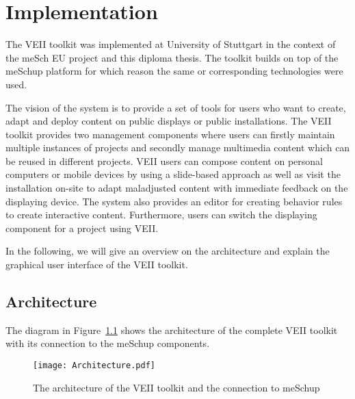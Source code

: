 
\chapter{Implementation}
\label{chap:implementation}
The VEII toolkit was implemented at University of Stuttgart in the context of the meSch EU project and this diploma thesis. The toolkit builds on top of the meSchup platform for which reason the same or corresponding technologies were used. 

The vision of the system is to provide a set of tools for users who want to create, adapt and deploy content on public displays or public installations. The VEII toolkit provides two management components where users can firstly maintain multiple instances of projects and secondly manage multimedia content which can be reused in different projects. VEII users can compose content on personal computers or mobile devices by using a slide-based approach as well as visit the installation on-site to adapt maladjusted content with immediate feedback on the displaying device. The system also provides an editor for creating behavior rules to create interactive content. Furthermore, users can switch the displaying component for a project using VEII.

In the following, we will give an overview on the architecture and explain the graphical user interface of the VEII toolkit. 
 
\section{Architecture}\label{architecture}
The diagram in Figure~\ref{fig:architecture} shows the architecture of the complete VEII toolkit with its connection to the meSchup components. 

\begin{figure}
  \begin{center}
    \texttt{[image: Architecture.pdf]}
    \caption{The architecture of the VEII toolkit and the connection to meSchup}
    \label{fig:architecture}
  \end{center}
\end{figure}

